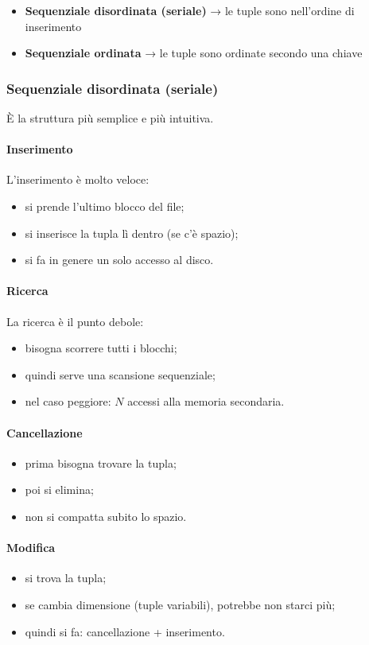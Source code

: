 \begin{itemize}
	\item \textbf{Sequenziale disordinata (seriale)} → le tuple sono nell'ordine di inserimento
	\item \textbf{Sequenziale ordinata} → le tuple sono ordinate secondo una chiave
\end{itemize}

\subsubsection{Sequenziale disordinata (seriale)}

È la struttura più semplice e più intuitiva.

\paragraph{Inserimento}
L'inserimento è molto veloce:
\begin{itemize}
	\item si prende l'ultimo blocco del file;
	\item si inserisce la tupla lì dentro (se c'è spazio);
	\item si fa in genere un solo accesso al disco.
\end{itemize}

\paragraph{Ricerca}
La ricerca è il punto debole:
\begin{itemize}
	\item bisogna scorrere tutti i blocchi;
	\item quindi serve una scansione sequenziale;
	\item nel caso peggiore: $N$ accessi alla memoria secondaria.
\end{itemize}

\paragraph{Cancellazione}
\begin{itemize}
	\item prima bisogna trovare la tupla;
	\item poi si elimina;
	\item non si compatta subito lo spazio.
\end{itemize}

\paragraph{Modifica}
\begin{itemize}
	\item si trova la tupla;
	\item se cambia dimensione (tuple variabili), potrebbe non starci più;
	\item quindi si fa: cancellazione + inserimento.
\end{itemize}

